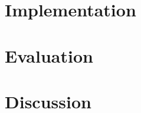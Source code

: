 \documentclass[12pt, a4paper]{report}
\begin{document}
\chapter{Implementation} \label{chapter:implementation}

\chapter{Evaluation} \label{chapter:evaluation}

\chapter{Discussion} \label{chapter:discussion}

\onecolumn
{}
\printbibliography[title = {References}]
\end{document}
